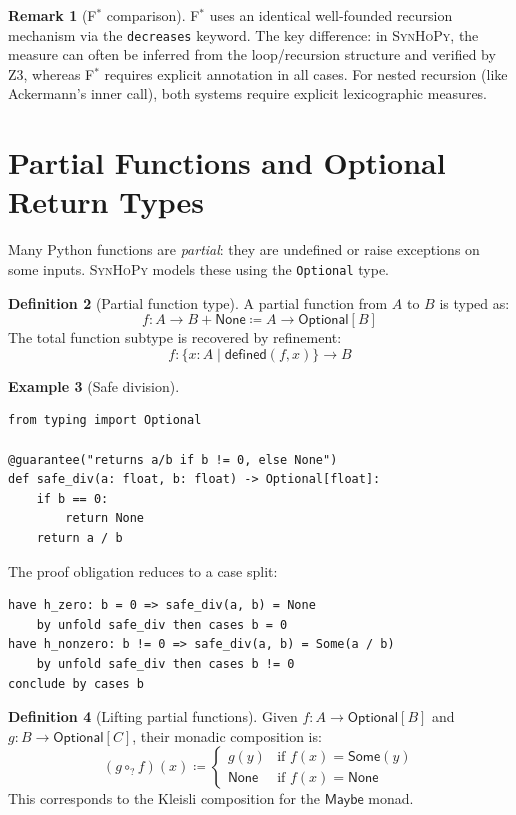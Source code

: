 \documentclass[11pt,a4paper]{report}
\theoremstyle{definition}
\newtheorem{definition}{Definition}[chapter]
\newtheorem{example}[definition]{Example}
\newtheorem{remark}[definition]{Remark}
\theoremstyle{plain}
\newcommand{\defeq}{\coloneqq}
\newcommand{\fstar}{F$^{*}$}
\newcommand{\synhopy}{\textsc{SynHoPy}}
\begin{document}
\begin{remark}[\fstar{} comparison]
\fstar{} uses an identical well-founded recursion mechanism via the
\lstinline[style=fstar]|decreases| keyword. The key difference: in \synhopy{},
the measure can often be inferred from the loop/recursion structure and verified
by Z3, whereas \fstar{} requires explicit annotation in all cases. For nested
recursion (like Ackermann's inner call), both systems require explicit
lexicographic measures.
\end{remark}


\section{Partial Functions and Optional Return Types}
\label{sec:partial}

Many Python functions are \emph{partial}: they are undefined or raise exceptions
on some inputs. \synhopy{} models these using the \texttt{Optional} type.

\begin{definition}[Partial function type]
A partial function from $A$ to $B$ is typed as:
\[
  f : A \to B + \mathsf{None} \defeq A \to \mathsf{Optional}[B]
\]
The total function subtype is recovered by refinement:
\[
  f : \{x : A \mid \mathsf{defined}(f, x)\} \to B
\]
\end{definition}

\begin{example}[Safe division]
\begin{lstlisting}[style=synhopy]
from typing import Optional

@guarantee("returns a/b if b != 0, else None")
def safe_div(a: float, b: float) -> Optional[float]:
    if b == 0:
        return None
    return a / b
\end{lstlisting}

The proof obligation reduces to a case split:
\begin{lstlisting}[style=proof]
have h_zero: b = 0 => safe_div(a, b) = None
    by unfold safe_div then cases b = 0
have h_nonzero: b != 0 => safe_div(a, b) = Some(a / b)
    by unfold safe_div then cases b != 0
conclude by cases b
\end{lstlisting}
\end{example}

\begin{definition}[Lifting partial functions]
Given $f : A \to \mathsf{Optional}[B]$ and $g : B \to \mathsf{Optional}[C]$, their
monadic composition is:
\[
  (g \circ_? f)(x) \defeq
  \begin{cases}
    g(y) & \text{if } f(x) = \mathsf{Some}(y) \\
    \mathsf{None} & \text{if } f(x) = \mathsf{None}
  \end{cases}
\]
This corresponds to the Kleisli composition for the $\mathsf{Maybe}$ monad.
\end{definition}
\end{document}
